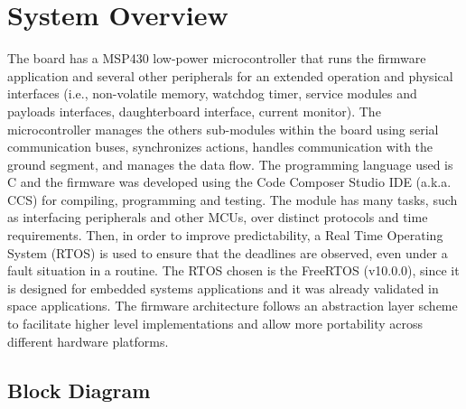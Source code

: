%
%
%
%
%

%
%
%
%
%
%

\chapter{System Overview} \label{ch:system-overview}

The board has a MSP430 low-power microcontroller that runs the firmware application and several other peripherals for an extended operation and physical interfaces (i.e., non-volatile memory, watchdog timer, service modules and payloads interfaces, daughterboard interface, current monitor). The microcontroller manages the others sub-modules within the board using serial communication buses, synchronizes actions, handles communication with the ground segment, and manages the data flow. The programming language used is C and the firmware was developed using the Code Composer Studio IDE (a.k.a. CCS) for compiling, programming and testing. The module has many tasks, such as interfacing peripherals and other MCUs, over distinct protocols and time requirements. Then, in order to improve predictability, a Real Time Operating System (RTOS) is used to ensure that the deadlines are observed, even under a fault situation in a routine. The RTOS chosen is the FreeRTOS (v10.0.0), since it is designed for embedded systems applications and it was already validated in space applications. The firmware architecture follows an abstraction layer scheme to facilitate higher level implementations and allow more portability across different hardware platforms.

\section{Block Diagram}

